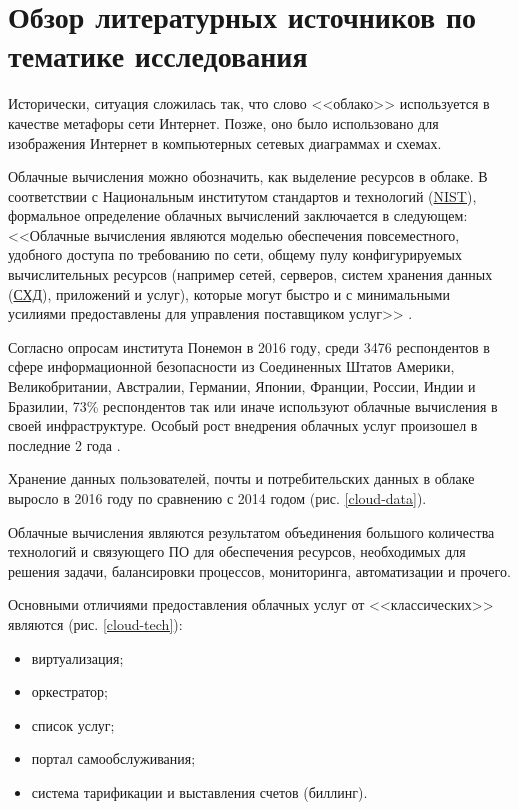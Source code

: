 \section{Обзор литературных источников по тематике исследования} \label{literature}

Исторически, ситуация сложилась так, что слово <<облако>> используется в качестве метафоры сети Интернет.
Позже, оно было использовано для изображения Интернет в компьютерных сетевых диаграммах и схемах.

Облачные вычисления можно обозначить, как выделение ресурсов в облаке.
В соответствии с Национальным институтом стандартов и технологий (\hyperlink{nist}{NIST}), формальное определение облачных вычислений заключается в следующем:
<<Облачные вычисления являются моделью обеспечения повсеместного, удобного доступа по требованию по сети, общему пулу конфигурируемых вычислительных ресурсов (например сетей, серверов, систем хранения данных (\hyperlink{storage}{СХД}), приложений и услуг), которые могут быстро и с минимальными усилиями предоставлены для управления поставщиком услуг>> \cite{nist}.

Согласно опросам института Понемон в 2016 году, среди 3476 респондентов в сфере информационной безопасности из Соединенных Штатов Америки, Великобритании, Австралии, Германии, Японии, Франции, России, Индии и Бразилии, 73\% респондентов так или иначе используют облачные вычисления в своей инфраструктуре.
Особый рост внедрения облачных услуг произошел в последние 2 года \cite{gemalto}.

Хранение данных пользователей, почты и потребительских данных в облаке выросло в 2016 году по сравнению с 2014 годом (рис. \ref{cloud-data}).


Облачные вычисления являются результатом объединения большого количества технологий и связующего ПО для обеспечения ресурсов, необходимых для решения задачи, балансировки процессов, мониторинга, автоматизации и прочего.

Основными отличиями предоставления облачных услуг от <<классических>> являются (рис. \ref{cloud-tech}):
\begin{itemize}
  \item виртуализация;
  \item оркестратор;
  \item список услуг;
  \item портал самообслуживания;
  \item система тарификации и выставления счетов (биллинг).
\end{itemize}

